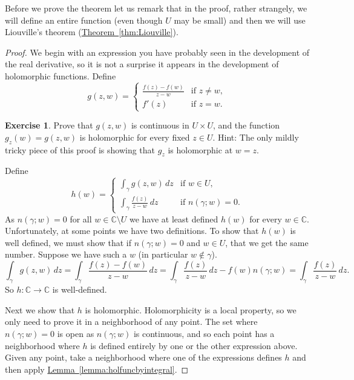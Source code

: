 \documentclass[12pt,openany]{book}
\newcommand{\C}{{\mathbb{C}}}
\theoremstyle{plain}
\theoremstyle{remark}
\theoremstyle{definition}
\newenvironment{exbox}{%
    \def\FrameCommand{\vrule width 1pt \relax\hspace {10pt}}%
    \MakeFramed {\advance \hsize -\width \FrameRestore }%
}{%
    \endMakeFramed
}
\theoremstyle{exercise}
\newtheorem{exercise}{Exercise}[section]
\theoremstyle{example}
\newcommand{\thmref}[1]{\hyperref[#1]{Theorem~\ref*{#1}}}
\newcommand{\lemmaref}[1]{\hyperref[#1]{Lemma~\ref*{#1}}}
\begin{document}
Before we prove the theorem let us remark
that in the proof, rather strangely, we will define an entire
function (even though $U$ may be small) and then we will use
Liouville's theorem (\thmref{thm:Liouville}).

\begin{proof}
We begin with an expression you have probably seen in the development of the real
derivative, so it is not a surprise it appears in the development of
holomorphic functions.
Define
\begin{equation*}
g(z,w) =
\begin{cases}
\frac{f(z)-f(w)}{z-w} & \text{if } z \not= w , \\
f'(z)                 & \text{if } z = w .
\end{cases}
\end{equation*}

\begin{exbox}
\begin{exercise}
Prove that $g(z,w)$ is continuous in $U \times U$, and 
the function $g_z(w) = g(z,w)$ is holomorphic for every fixed $z \in U$.
Hint: The only mildly tricky piece of this proof is showing that $g_z$ is
holomorphic at $w=z$.
\end{exercise}
\end{exbox}

Define
\begin{equation*}
h(w) = 
\begin{cases}
\int_\gamma g(z,w) \, dz & \text{if } w \in U , \\
\int_\gamma \frac{f(z)}{z-w} \, dz & \text{if } n(\gamma;w) = 0 .
\end{cases}
\end{equation*}
As $n(\gamma;w) = 0$ for all $w \in \C \setminus U$ we have at least
defined $h(w)$ for every $w \in \C$.  Unfortunately, at some points
we have two definitions.
To show that $h(w)$ is well defined, we must show that if
$n(\gamma;w) = 0$ and $w \in U$, that we get the same number.
Suppose
we have such a $w$ (in particular $w \notin \gamma$).
\begin{equation*}
\int_\gamma g(z,w) \, dz
=
\int_\gamma \frac{f(z)-f(w)}{z-w} \, dz
=
\int_\gamma \frac{f(z)}{z-w} \, dz
-
f(w) n(\gamma;w)
=
\int_\gamma \frac{f(z)}{z-w} \, dz .
\end{equation*}
So $h \colon \C \to \C$ is well-defined.

Next we show that $h$ is
holomorphic.
Holomorphicity is a local property, so we only need to prove it 
in a neighborhood of any point.
The set where $n(\gamma;w) = 0$ is open as $n(\gamma;w)$ is
continuous, and so each point has a neighborhood where $h$ is defined
entirely by one or the other expression above.  Given any point,
take a neighborhood where one of the expressions defines
$h$ and then apply \lemmaref{lemma:holfuncbyintegral}.


\end{proof}
\end{document}
